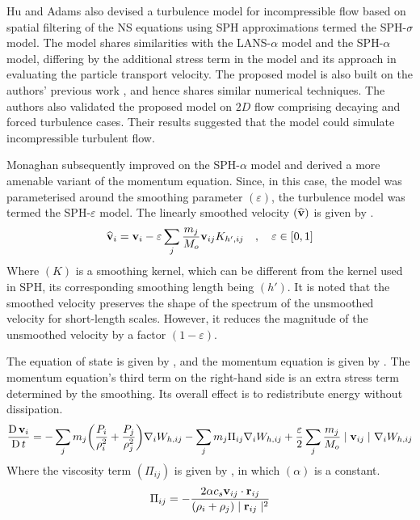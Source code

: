 Hu and Adams \parencite{Hu2015} also devised a turbulence model for incompressible flow based on spatial filtering of the NS equations using SPH approximations termed the SPH-$\sigma$ model. The model shares similarities with the LANS-$\alpha$ model and the SPH-$\alpha$ model, differing by the additional stress term in the model and its approach in evaluating the particle transport velocity. The proposed model is also built on the authors’ previous work \parencite{hu2007incompressible}, and hence shares similar numerical techniques. The authors also validated the proposed model on $2D$ flow comprising decaying and forced turbulence cases. Their results suggested that the model could simulate incompressible turbulent flow.

Monaghan \parencite{Monaghan2011, Monaghan2017} subsequently improved on the SPH-$\alpha$ model and derived a more amenable variant of the momentum equation. Since, in this case, the model was parameterised around the smoothing parameter $(\varepsilon)$, the turbulence model was termed the SPH-$\varepsilon$ model. The linearly smoothed velocity $(\widehat{\mathbf{v}})$ is given by .
\begin{equation}
    \widehat{\vect{v}}_i = \vect{v}_i - \varepsilon \sum_j \frac{m_j}{M_o} \VIJ K_{h', ij} \quad , \quad \varepsilon \in [0, 1]
    \label{eq:Monaghan2017-xsph-vel-smoothing}
\end{equation}
Where $(K)$ is a smoothing kernel, which can be different from the kernel used in SPH, its corresponding smoothing length being $(h')$. It is noted that the smoothed velocity preserves the shape of the spectrum of the unsmoothed velocity for short-length scales. However, it reduces the magnitude of the unsmoothed velocity by a factor $(1-\varepsilon)$. 

The equation of state is given by , and the momentum equation is given by . The momentum equation’s third term on the right-hand side is an extra stress term determined by the smoothing. Its overall effect is to redistribute energy without dissipation.
\begin{equation}
    \LagDerivative{\vect{v}_i} = - \sum_j m_j \bigg( \frac{P_i}{\rho_i^2} + \frac{P_j}{\rho_j^2} \bigg) \DWIJ - \sum_j m_j \Pi_{ij} \DWIJ + \frac{\varepsilon}{2} \sum_j \frac{m_j}{M_o} \VtwoIJ[] \DWIJ 
    \label{eq:Monaghan2017-mom-governing}
\end{equation}
Where the viscosity term $(\Pi_{ij})$ is given by , in which $(\alpha)$ is a constant.
\begin{equation}
    \Pi_{ij} = - \frac{2 \alpha c_s \VIJ \cdot \RIJ}{(\rho_i + \rho_j) \RtwoIJ}
    \label{eq:Monaghan2017-Pi-visc-term}
\end{equation}

